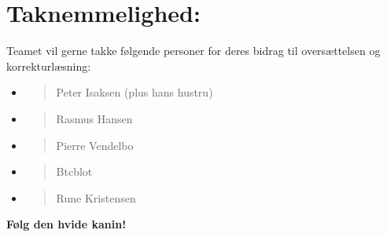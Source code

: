 \section*{Taknemmelighed:}

Teamet vil gerne takke følgende personer for deres bidrag til
oversættelsen og korrekturlæsning:

\begin{itemize}
\item
  \begin{quote}
  Peter Isaksen (plus hans hustru)
  \end{quote}
\item
  \begin{quote}
  Rasmus Hansen
  \end{quote}
\item
  \begin{quote}
  Pierre Vendelbo
  \end{quote}
\item
  \begin{quote}
  Btcblot
  \end{quote}
\item
  \begin{quote}
  Rune Kristensen
  \end{quote}
\end{itemize}

\textbf{Følg den hvide kanin!}
